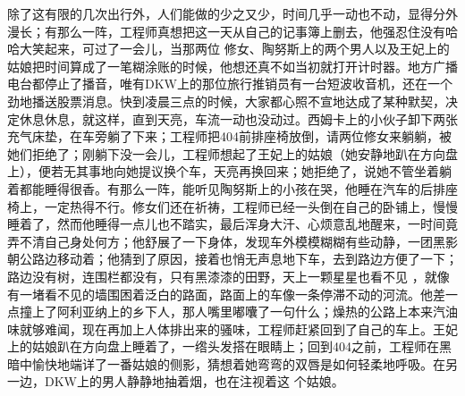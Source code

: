\documentclass{article}
\begin{document}
除了这有限的几次出行外，人们能做的少之又少，时间几乎一动也不动，显得分外漫长；有那么一阵，工程师真想把这一天从自己的记事簿上删去，他强忍住没有哈哈大笑起来，可过了一会儿，当那两位
\newpage
修女、陶努斯上的两个男人以及王妃上的姑娘把时间算成了一笔糊涂账的时候，他想还真不如当初就打开计时器。地方广播电台都停止了播音，唯有DKW上的那位旅行推销员有一台短波收音机，还在一个劲地播送股票消息。快到凌晨三点的时候，大家都心照不宣地达成了某种默契，决定休息休息，就这样，直到天亮，车流一动也没动过。西姆卡上的小伙子卸下两张充气床垫，在车旁躺了下来；工程师把404前排座椅放倒，请两位修女来躺躺，被她们拒绝了；刚躺下没一会儿，工程师想起了王妃上的姑娘（她安静地趴在方向盘上），便若无其事地向她提议换个车，天亮再换回来；她拒绝了，说她不管坐着躺着都能睡得很香。有那么一阵，能听见陶努斯上的小孩在哭，他睡在汽车的后排座椅上，一定热得不行。修女们还在祈祷，工程师已经一头倒在自己的卧铺上，慢慢睡着了，然而他睡得一点儿也不踏实，最后浑身大汗、心烦意乱地醒来，一时间竟弄不清自己身处何方；他舒展了一下身体，发现车外模模糊糊有些动静，一团黑影朝公路边移动着；他猜到了原因，接着也悄无声息地下车，去到路边方便了一下；路边没有树，连围栏都没有，只有黑漆漆的田野，天上一颗星星也看不见
\newpage
，就像有一堵看不见的墙围困着泛白的路面，路面上的车像一条停滞不动的河流。他差一点撞上了阿利亚纳上的乡下人，那人嘴里嘟囔了一句什么；燥热的公路上本来汽油味就够难闻，现在再加上人体排出来的骚味，工程师赶紧回到了自己的车上。王妃上的姑娘趴在方向盘上睡着了，一绺头发搭在眼睛上；回到404之前，工程师在黑暗中愉快地端详了一番姑娘的侧影，猜想着她弯弯的双唇是如何轻柔地呼吸。在另一边，DKW上的男人静静地抽着烟，也在注视着这
个姑娘。 
\end{document}

